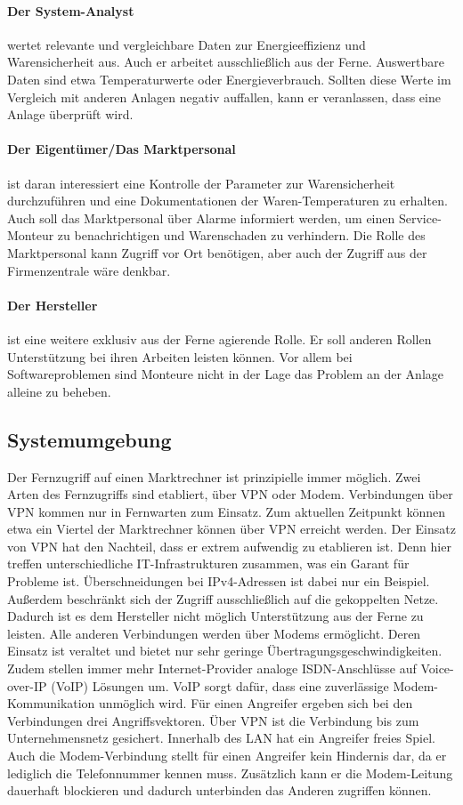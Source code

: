 \documentclass[11pt,a4paper]{report}
\begin{document}
\paragraph{Der System-Analyst} wertet relevante und vergleichbare Daten zur Energieeffizienz und Warensicherheit aus. Auch er arbeitet ausschließlich aus der Ferne. Auswertbare Daten sind etwa Temperaturwerte oder Energieverbrauch. Sollten diese Werte im Vergleich mit anderen Anlagen negativ auffallen, kann er veranlassen, dass eine Anlage überprüft wird.

\paragraph{Der Eigentümer/Das Marktpersonal} ist daran interessiert eine Kontrolle der Parameter zur Warensicherheit durchzuführen und eine Dokumentationen der Waren-Temperaturen zu erhalten. Auch soll das Marktpersonal über Alarme informiert werden, um einen Service-Monteur zu benachrichtigen und Warenschaden zu verhindern. Die Rolle des Marktpersonal kann Zugriff vor Ort benötigen, aber auch der Zugriff aus der Firmenzentrale wäre denkbar.

\paragraph{Der Hersteller} ist eine weitere exklusiv aus der Ferne agierende Rolle. Er soll anderen Rollen Unterstützung bei ihren Arbeiten leisten können. Vor allem bei Softwareproblemen sind Monteure nicht in der Lage das Problem an der Anlage alleine zu beheben.

\subsection{Systemumgebung}

Der Fernzugriff auf einen Marktrechner ist prinzipielle immer möglich. Zwei Arten des Fernzugriffs sind etabliert, über VPN oder Modem. Verbindungen über VPN kommen nur in Fernwarten zum Einsatz. Zum aktuellen Zeitpunkt können etwa ein Viertel der Marktrechner können über VPN erreicht werden. Der Einsatz von VPN hat den Nachteil, dass er extrem aufwendig zu etablieren ist. Denn hier treffen unterschiedliche IT-Infrastrukturen zusammen, was ein Garant für Probleme ist. Überschneidungen bei IPv4-Adressen ist dabei nur ein Beispiel. Außerdem beschränkt sich der Zugriff ausschließlich auf die gekoppelten Netze. Dadurch ist es dem Hersteller nicht möglich Unterstützung aus der Ferne zu leisten. Alle anderen Verbindungen werden über Modems ermöglicht. Deren Einsatz ist veraltet und bietet nur sehr geringe Übertragungsgeschwindigkeiten. Zudem stellen immer mehr Internet-Provider analoge ISDN-Anschlüsse auf Voice-over-IP (VoIP) Lösungen um. VoIP sorgt dafür, dass eine zuverlässige Modem-Kommunikation unmöglich wird. Für einen Angreifer ergeben sich bei den Verbindungen drei Angriffsvektoren. Über VPN ist die Verbindung bis zum Unternehmensnetz gesichert. Innerhalb des LAN hat ein Angreifer freies Spiel. Auch die Modem-Verbindung stellt für einen Angreifer kein Hindernis dar, da er lediglich die Telefonnummer kennen muss. Zusätzlich kann er die Modem-Leitung dauerhaft blockieren und dadurch unterbinden das Anderen zugriffen können.
\end{document}
